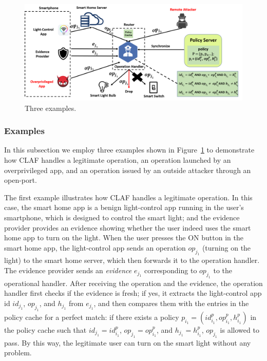 \documentclass[letterpaper,12pt]{article}
\begin{document}
\begin{figure}[!htb]
        \centering
        \includegraphics[scale=0.25]{examples.png}
        \caption{Three examples.}
        \label{fig:examples}
\end{figure}

\subsubsection{Examples} \label{sec:examples}

In this subsection we employ three examples shown in Figure~\ref{fig:examples} to demonstrate how CLAF handles a legitimate operation, an operation launched by an overprivileged app, and an operation issued by an outside attacker through an open-port. 

The first example illustrates how CLAF handles a legitimate operation. In this case, the smart home app is a benign light-control app running in the user's smartphone, which is designed to control the smart light; and the evidence provider provides an evidence showing whether the user indeed uses the smart home app to turn on the light. When the user presses the ON button in the smart home app, the light-control app sends an operation $op_{j_1}$ (turning on the light) to the smart home server, which then forwards it to the operation handler. The evidence provider sends an \textit{evidence} $e_{j_1}$ corresponding to $op_{j_1}$ to the operational handler. After receiving the operation and the evidence, the operation handler first checks if the evidence is fresh; if yes, it extracts the light-control app id $id_{j_1}$, $op_{j_1}$, and $h_{j_1}$ from  $e_{j_1}$, and then compares them with the entries in the policy cache for a perfect match: if there exists a policy $p_{i_1}=(id^{p}_{i_1}, op^{p}_{i_1}, h^{p}_{i_1})$ in the policy cache such that $id_{j_1}=id^{p}_{i_1}$,  $op_{j_1}=op^{p}_{i_1}$, and $h_{j_1}=h^{p}_{i_1}$, $op_{j_1}$ is allowed to pass. By this way, the legitimate user can turn on the smart light without any problem.
\end{document}
